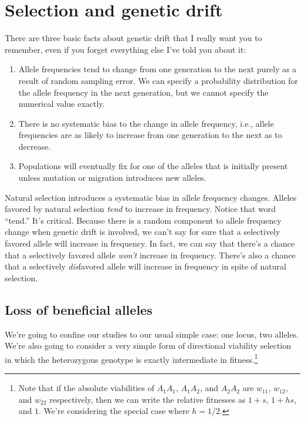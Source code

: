 \chapter{Selection and genetic drift}

There are three basic facts about genetic drift that I really want you
to remember, even if you forget everything else I've told you about
it:

\begin{enumerate}

\item Allele frequencies tend to change from one generation to the
next purely as a result of random sampling error. We can specify a
probability distribution for the allele frequency in the next
generation, but we cannot specify the numerical value exactly.

\item There is no systematic bias to the change in allele frequency,
i.e., allele frequencies are as likely to increase from one generation
to the next as to decrease.

\item Populations will eventually fix for one of the alleles that is
initially present unless mutation or migration introduces new
alleles. 

\end{enumerate}

Natural selection introduces a systematic bias in allele frequency
changes. Alleles favored by natural selection {\it tend\/} to increase
in frequency. Notice that word ``tend.'' It's critical. Because there
is a random component to allele frequency change when genetic drift is
involved, we can't say for sure that a selectively favored allele will
increase in frequency. In fact, we can say that there's a chance that
a selectively favored allele {\it won't\/} increase in
frequency. There's also a chance that a selectively {\it dis\/}favored
allele will increase in frequency in spite of natural selection.

\section*{Loss of beneficial alleles}

We're going to confine our studies to our usual simple case: one
locus, two alleles. We're also going to consider a very simple form of
directional viability selection in which the heterozygous genotype is
exactly intermediate in fitness.\footnote{Note that if the absolute
  viabilities of $A_1A_1$, $A_1A_2$, and $A_2A_2$ are $w_{11}$,
  $w_{12}$, and $w_{22}$ respectively, then we can write the relative
  fitnesses as $1+s$, $1+hs$, and $1$. We're considering the special
  case where $h=1/2$.}


